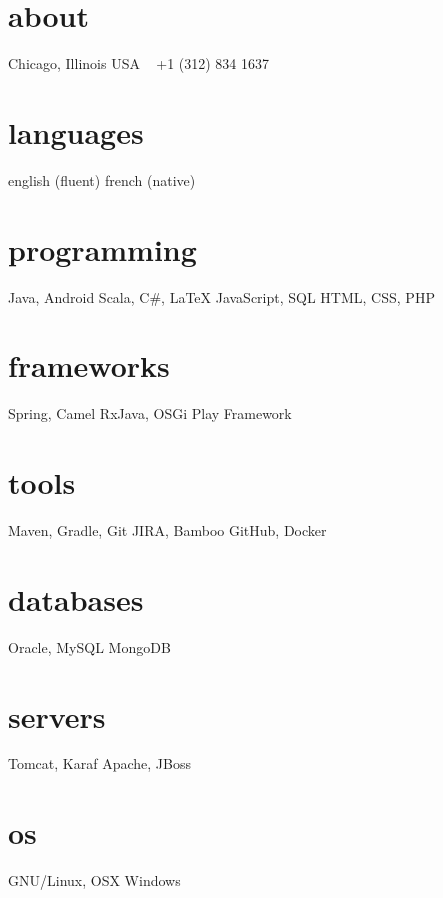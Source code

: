 \documentclass[]{friggeri-cv} %
\begin{document}



\begin{aside} %
\section{about}
{\color{darkgray}Chicago, Illinois
USA
~
+1 (312) 834 1637
~
\section{languages}
english (fluent)
french (native)
\section{programming}
Java, Android
Scala, C\#, \LaTeX
JavaScript, SQL
HTML, CSS, PHP
\section{frameworks}
Spring, Camel
RxJava, OSGi 
Play Framework
\section{tools}
Maven, Gradle, Git
JIRA, Bamboo
GitHub, Docker
\section{databases}
Oracle, MySQL
MongoDB}
\section{servers}
Tomcat, Karaf 
Apache, JBoss
\section{os}
GNU/Linux, OSX
Windows
\end{aside}
\end{document}
